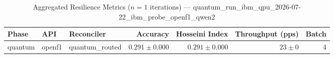 
\begin{table}[htbp]
\caption{Aggregated Resilience Metrics ($n=1$ iterations) --- quantum_run_ibm_qpu_2026-07-22_ibm_probe_openf1_qwen2}
\begin{tabular}{l l l r r r r}
\hline
Phase & API & Reconciler & Accuracy & Hosseini Index & Throughput (pps) & Batch \\
\hline
quantum & openf1 & quantum\_routed & $0.291\pm0.000$ & $0.291\pm0.000$ & $23\pm0$ & 4 \\
\hline
\end{tabular}
\end{table}
